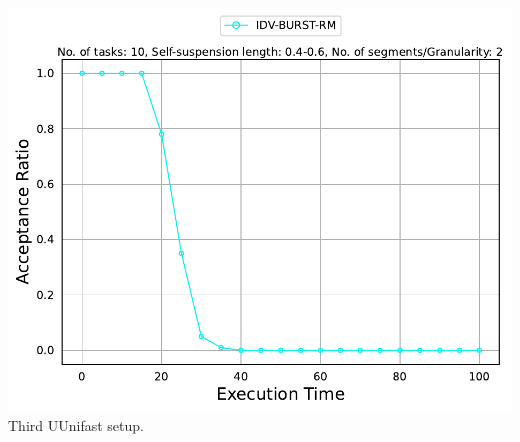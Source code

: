 \documentclass[]{article}
\begin{document}
\begin{minipage}[t]{0.48\linewidth}
		\includegraphics[width=\linewidth]{IDV-BURST-RM[2][0.4-0.6][10].pdf}
		Third UUnifast setup.
		\vspace{0.3cm}
		
		
	\end{minipage}\hfill
\end{document}
